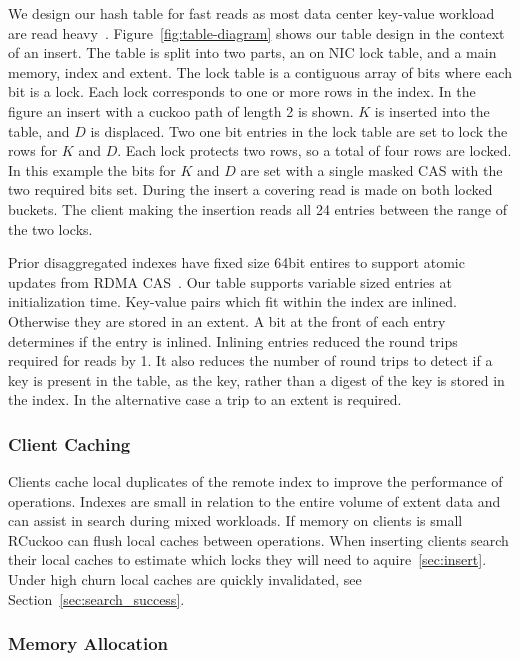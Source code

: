 We design our hash table for fast reads as most data center
key-value workload are read heavy~\cite{facebook-memcached}.
Figure~\ref{fig:table-diagram} shows our table design in the
context of an insert. The table is split into two parts, an
on NIC lock table, and a main memory, index and extent. The
lock table is a contiguous array of bits where each bit is a
lock. Each lock corresponds to one or more rows in the
index. In the figure an insert with a cuckoo path of length
2 is shown. $K$ is inserted into the table, and $D$ is
displaced. Two one bit entries in the lock table are set to
lock the rows for $K$ and $D$. Each lock protects two rows,
so a total of four rows are locked. In this example the bits
for $K$ and $D$ are set with a single masked CAS with the
two required bits set. During the insert a covering read is
made on both locked buckets. The client making the insertion
reads all 24 entries between the range of the two locks.

Prior disaggregated indexes have fixed size 64bit entires to
support atomic updates from RDMA
CAS~\cite{fusee,race,rolex}. Our table supports variable
sized entries at initialization time. Key-value pairs which
fit within the index are inlined. Otherwise they are stored
in an extent. A bit at the front of each entry determines if
the entry is inlined. Inlining entries reduced the round
trips required for reads by 1. It also reduces the number of
round trips to detect if a key is present in the table, as
the key, rather than a digest of the key is stored in the
index. In the alternative case a trip to an extent is
required.

\subsubsection{Client Caching}

Clients cache local duplicates of the remote index to
improve the performance of operations. Indexes are small in
relation to the entire volume of extent data and can assist
in search during mixed workloads. If memory on clients is
small RCuckoo can flush local caches between operations.
When inserting clients search their local caches to estimate
which locks they will need to aquire~\ref{sec:insert}. Under
high churn local caches are quickly invalidated, see
Section~\ref{sec:search_success}.


\subsubsection{Memory Allocation}

